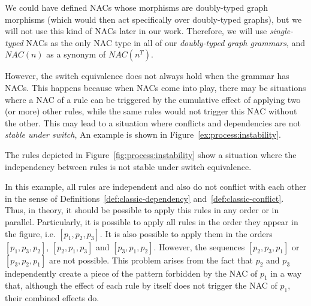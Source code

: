 \begin{remark}
We could have defined NACs whose morphisms are doubly-typed graph morphisms (which would then act specifically over doubly-typed graphs), but we will not use this kind of NACs later in our work. Therefore, we will use \emph{single-typed} NACs as the only NAC type in all of our \emph{doubly-typed graph grammars}, and $NAC(n)$ as a synonym of $NAC(n^T)$.
\end{remark}


However, the switch equivalence does not always hold when the grammar has NACs. This happens because when NACs come into play, there may be situations where a NAC of a rule can be triggered by the cumulative effect of applying two (or more) other rules, while the same rules would not trigger this NAC without the other. This may lead to a situation where conflicts and dependencies
are not \emph{stable under switch},  An example is shown in Figure~\ref{ex:process:instability}.

\begin{example}\label{ex:process:instability}The rules depicted in Figure~\ref{fig:process:instability} show a situation where the independency between rules is not stable under switch equivalence.

  In this example, all rules are independent and also do not conflict with each other in the sense of Definitions~\ref{def:classic-dependency} and~\ref{def:classic-conflict}. Thus, in theory, it should be possible to apply this rules in any order or in parallel. Particularly, it is possible to apply all rules in the order they appear in the figure, i.e. $[p_1, p_2, p_3]$. It is also possible to apply them in the orders $[p_1, p_3, p_2]$, $[p_2, p_1, p_3]$ and $[p_3, p_1, p_2]$. However, the
  sequences $[p_2, p_3, p_1]$ or $[p_3, p_2, p_1]$ are not possible. This problem arises from the fact that $p_2$ and $p_3$ independently create a piece of the pattern forbidden by the NAC of $p_1$ in a way that, although the effect of each rule by itself does not trigger the NAC of $p_1$, their combined effects do.
\end{example}

